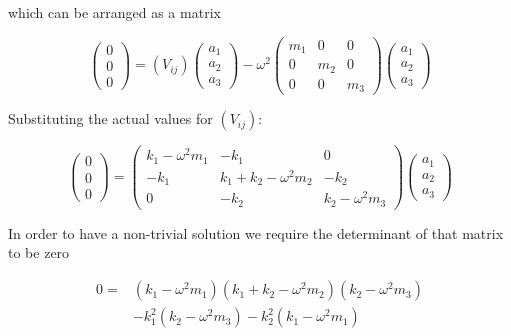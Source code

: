 which can be arranged as a matrix

\begin{equation}
\left( \begin{array}{c} 0\\ 0\\ 0 \end{array}\right) = (V_{ij}) \left(\begin{array}{c} a_1 \\ a_2 \\ a_3 \end{array}\right) - \omega^2 \left( \begin{array}{ccc} m_1 & 0 & 0 \\ 0 & m_2 & 0 \\ 0 & 0 & m_3 \end{array}\right) \left(\begin{array}{c} a_1 \\ a_2 \\ a_3 \end{array}\right)
\end{equation}

Substituting the actual values for $(V_{ij})$:

\begin{equation}
\left( \begin{array}{c} 0\\ 0\\ 0 \end{array}\right) 
= \left( \begin{array}{ccc} k_1-\omega^2m_1 & -k_1 & 0 \\ -k_1 & k_1+k_2-\omega^2m_2 & -k_2 \\ 0 & -k_2 & k_2-\omega^2m_3 \end{array}\right) \left(\begin{array}{c} a_1 \\ a_2 \\ a_3 \end{array}\right)
\end{equation}

In order to have a non-trivial solution we require the determinant of that matrix to be zero

\begin{equation}\label{eq:det}
\begin{split}
0 = & (k_1-\omega^2m_1)(k_1+k_2-\omega^2m_2)(k_2-\omega^2m_3) \\
    & -k_1^2(k_2-\omega^2m_3)-k_2^2(k_1-\omega^2m_1)
\end{split}
\end{equation}

